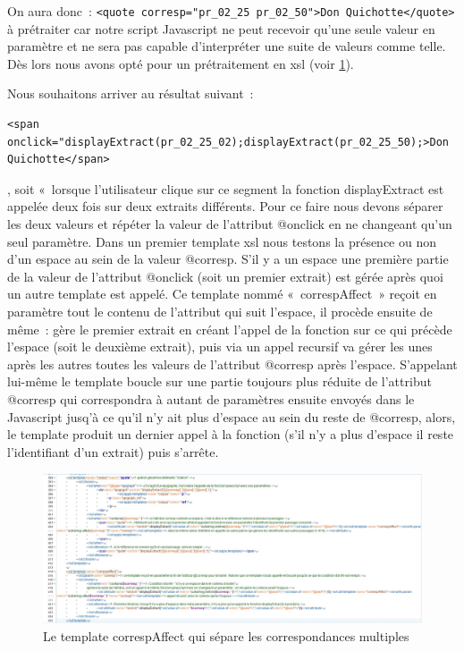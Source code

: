 On aura donc~: \verb|<quote corresp="pr_02_25 pr_02_50">Don Quichotte</quote>| à prétraiter car notre script Javascript ne peut recevoir qu'une seule valeur en paramètre et ne sera pas capable d'interpréter une suite de valeurs comme telle. Dès lors nous avons opté pour un prétraitement en xsl (voir \ref{fig:corrspAfect}).


Nous souhaitons arriver au résultat suivant~: \begin{verbatim}<span onclick="displayExtract(pr_02_25_02);displayExtract(pr_02_25_50);>Don
Quichotte</span>\end{verbatim}, soit «~lorsque l'utilisateur clique sur ce segment la fonction displayExtract est appelée deux fois sur deux extraits différents. Pour ce faire nous devons séparer les deux valeurs et répéter la valeur de l'attribut @onclick en ne changeant qu'un seul paramètre. Dans un premier template xsl nous testons la présence ou non d'un espace au sein de la valeur @corresp. S'il y a un espace une première partie de la valeur de l'attribut @onclick (soit un premier extrait) est gérée après quoi un autre template est appelé. Ce template nommé «~correspAffect~» reçoit en paramètre tout le contenu de l'attribut qui suit l'espace, il procède ensuite de même~: gère le premier extrait en créant l'appel de la fonction sur ce qui précède l'espace (soit le deuxième extrait), puis via un appel recursif va gérer les unes après les autres toutes les valeurs de l'attribut @corresp après l'espace. S'appelant lui-même le template boucle sur une partie toujours plus réduite de l'attribut @corresp qui correspondra à autant de paramètres ensuite envoyés dans le Javascript jusq'à ce qu'il n'y ait plus d'espace au sein du reste de @corresp, alors, le template produit un dernier appel à la fonction (s'il n'y a plus d'espace il reste l'identifiant d'un extrait) puis s'arrête.

\begin{figure}[H]
    \centering
    \includegraphics[scale=0.5]{img/screen_quote_xsl.jpg}
    \caption{Le template correspAffect qui sépare les correspondances multiples}
    \label{fig:corrspAfect}
\end{figure}



